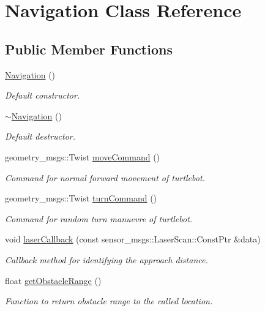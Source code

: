 \hypertarget{classNavigation}{}\section{Navigation Class Reference}
\label{classNavigation}
\subsection*{Public Member Functions}
\begin{DoxyCompactItemize}
\item 
\hyperlink{classNavigation_a81fdffdefe46340da5fa6c570066b42b}{Navigation} ()\hypertarget{classNavigation_a81fdffdefe46340da5fa6c570066b42b}{}\label{classNavigation_a81fdffdefe46340da5fa6c570066b42b}

\begin{DoxyCompactList}\small\item\em Default constructor. \end{DoxyCompactList}\item 
\hyperlink{classNavigation_addd4022d716df48f4e55a1db69361ba7}{$\sim$\+Navigation} ()\hypertarget{classNavigation_addd4022d716df48f4e55a1db69361ba7}{}\label{classNavigation_addd4022d716df48f4e55a1db69361ba7}

\begin{DoxyCompactList}\small\item\em Default destructor. \end{DoxyCompactList}\item 
geometry\+\_\+msgs\+::\+Twist \hyperlink{classNavigation_a0d5ecbd5efcd250ceab9dd58d98f46dd}{move\+Command} ()
\begin{DoxyCompactList}\small\item\em Command for normal forward movement of turtlebot. \end{DoxyCompactList}\item 
geometry\+\_\+msgs\+::\+Twist \hyperlink{classNavigation_a2dc96ed9714f94b19ee026df3d7231b8}{turn\+Command} ()
\begin{DoxyCompactList}\small\item\em Command for random turn manuevre of turtlebot. \end{DoxyCompactList}\item 
void \hyperlink{classNavigation_a7ad2aff0c5dd26c698da92bec5dde402}{laser\+Callback} (const sensor\+\_\+msgs\+::\+Laser\+Scan\+::\+Const\+Ptr \&data)
\begin{DoxyCompactList}\small\item\em Callback method for identifying the approach distance. \end{DoxyCompactList}\item 
float \hyperlink{classNavigation_ae560b17a586f5340e31fffe865096d96}{get\+Obstacle\+Range} ()\hypertarget{classNavigation_ae560b17a586f5340e31fffe865096d96}{}\label{classNavigation_ae560b17a586f5340e31fffe865096d96}

\begin{DoxyCompactList}\small\item\em Function to return obstacle range to the called location. \end{DoxyCompactList}\end{DoxyCompactItemize}


